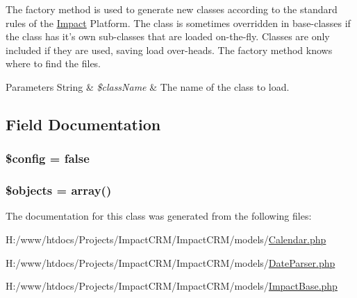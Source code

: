 The factory method is used to generate new classes according to the standard rules of the \hyperlink{namespaceImpact}{Impact} Platform. The class is sometimes overridden in base-\/classes if the class has it's own sub-\/classes that are loaded on-\/the-\/fly. Classes are only included if they are used, saving load over-\/heads. The factory method knows where to find the files.


\begin{DoxyParams}[1]{Parameters}
String & {\em \$className} & The name of the class to load. \\
\hline
\end{DoxyParams}


\subsection{Field Documentation}
\hypertarget{classImpactBase_a49c7011be9c979d9174c52a8b83e5d8e}{
\subsubsection[{\$config}]{\setlength{\rightskip}{0pt plus 5cm}\$config = false}}
\label{classImpactBase_a49c7011be9c979d9174c52a8b83e5d8e}
\hypertarget{classImpactBase_a255f6b6db4c45b1418e9c15cf4e2bcdd}{
\subsubsection[{\$objects}]{\setlength{\rightskip}{0pt plus 5cm}\$objects = array()}}
\label{classImpactBase_a255f6b6db4c45b1418e9c15cf4e2bcdd}


The documentation for this class was generated from the following files:\begin{DoxyCompactItemize}
\item 
H:/www/htdocs/Projects/ImpactCRM/ImpactCRM/models/\hyperlink{Calendar_8php}{Calendar.php}\item 
H:/www/htdocs/Projects/ImpactCRM/ImpactCRM/models/\hyperlink{DateParser_8php}{DateParser.php}\item 
H:/www/htdocs/Projects/ImpactCRM/ImpactCRM/models/\hyperlink{ImpactBase_8php}{ImpactBase.php}\end{DoxyCompactItemize}

